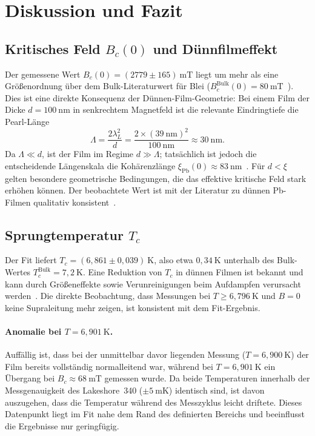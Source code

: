 \section{Diskussion und Fazit}
\label{sec:diskussion}

\subsection{Kritisches Feld $B_c(0)$ und Dünnfilmeffekt}

Der gemessene Wert $B_c(0) = (2779 \pm 165)~\mathrm{mT}$ liegt um mehr als eine Größenordnung über dem Bulk-Literaturwert für Blei ($B_c^\mathrm{Bulk}(0) = 80~\mathrm{mT}$~\cite{Buckel2013}).
Dies ist eine direkte Konsequenz der Dünnen-Film-Geometrie: Bei einem Film der Dicke $d = 100~\mathrm{nm}$ in senkrechtem Magnetfeld ist die relevante Eindringtiefe die Pearl-Länge~\cite{Pearl1964}
\begin{equation}
    \Lambda = \frac{2\lambda_L^2}{d} = \frac{2 \times (39~\mathrm{nm})^2}{100~\mathrm{nm}} \approx 30~\mathrm{nm}.
\end{equation}
Da $\Lambda \ll d$, ist der Film im Regime $d \gg \Lambda$; tatsächlich ist jedoch die entscheidende Längenskala die Kohärenzlänge $\xi_\mathrm{Pb}(0) \approx 83~\mathrm{nm}$~\cite{Tinkham2004}.
Für $d < \xi$ gelten besondere geometrische Bedingungen, die das effektive kritische Feld stark erhöhen können.
Der beobachtete Wert ist mit der Literatur zu dünnen Pb-Filmen qualitativ konsistent~\cite{Tinkham2004}.

\subsection{Sprungtemperatur $T_c$}

Der Fit liefert $T_c = (6{,}861 \pm 0{,}039)~\mathrm{K}$, also etwa $0{,}34~\mathrm{K}$ unterhalb des Bulk-Wertes $T_c^\mathrm{Bulk} = 7{,}2~\mathrm{K}$.
Eine Reduktion von $T_c$ in dünnen Filmen ist bekannt und kann durch Größeneffekte sowie Verunreinigungen beim Aufdampfen verursacht werden~\cite{Tinkham2004}.
Die direkte Beobachtung, dass Messungen bei $T \geq 6{,}796~\mathrm{K}$ und $B = 0$ keine Supraleitung mehr zeigen, ist konsistent mit dem Fit-Ergebnis.

\paragraph{Anomalie bei $T = 6{,}901~\mathrm{K}$.}
Auffällig ist, dass bei der unmittelbar davor liegenden Messung ($T = 6{,}900~\mathrm{K}$) der Film bereits vollständig normalleitend war, während bei $T = 6{,}901~\mathrm{K}$ ein Übergang bei $B_c \approx 68~\mathrm{mT}$ gemessen wurde.
Da beide Temperaturen innerhalb der Messgenauigkeit des Lakeshore~340 ($\pm 5~\mathrm{mK}$) identisch sind, ist davon auszugehen, dass die Temperatur während des Messzyklus leicht driftete.
Dieses Datenpunkt liegt im Fit nahe dem Rand des definierten Bereichs und beeinflusst die Ergebnisse nur geringfügig.

